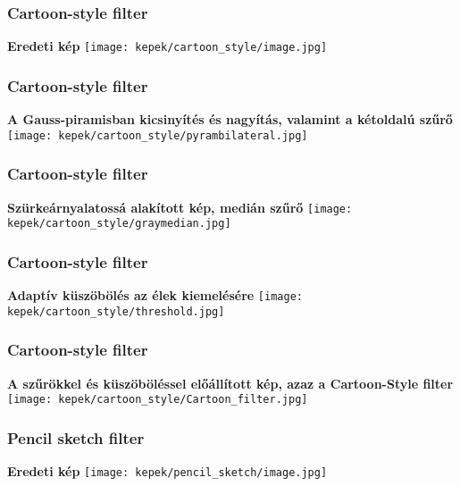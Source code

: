 \documentclass{beamer}
\begin{document}
\begin{frame}[fragile]
\frametitle{Cartoon-style filter}
\begin{center}
\textbf{Eredeti kép}
\texttt{[image: kepek/cartoon\_style/image.jpg]}
\end{center}
\end{frame}

\begin{frame}[fragile]
\frametitle{Cartoon-style filter}
\begin{center}
\textbf{A Gauss-piramisban kicsinyítés és nagyítás, valamint a kétoldalú szűrő}
\texttt{[image: kepek/cartoon\_style/pyrambilateral.jpg]}
\end{center}
\end{frame}

\begin{frame}[fragile]
\frametitle{Cartoon-style filter}
\begin{center}
\textbf{Szürkeárnyalatossá alakított kép, medián szűrő}
\texttt{[image: kepek/cartoon\_style/graymedian.jpg]}
\end{center}
\end{frame}

\begin{frame}[fragile]
\frametitle{Cartoon-style filter}
\begin{center}
\textbf{Adaptív küszöbölés az élek kiemelésére}
\texttt{[image: kepek/cartoon\_style/threshold.jpg]}
\end{center}
\end{frame}

\begin{frame}[fragile]
\frametitle{Cartoon-style filter}
\begin{center}
\textbf{A szűrökkel és küszöböléssel előállított kép, azaz a Cartoon-Style filter}
\texttt{[image: kepek/cartoon\_style/Cartoon\_filter.jpg]}
\end{center}
\end{frame}

\begin{frame}[fragile]
\frametitle{Pencil sketch filter}
\begin{center}
\textbf{Eredeti kép}
\texttt{[image: kepek/pencil\_sketch/image.jpg]}
\end{center}
\end{frame}
\end{document}
